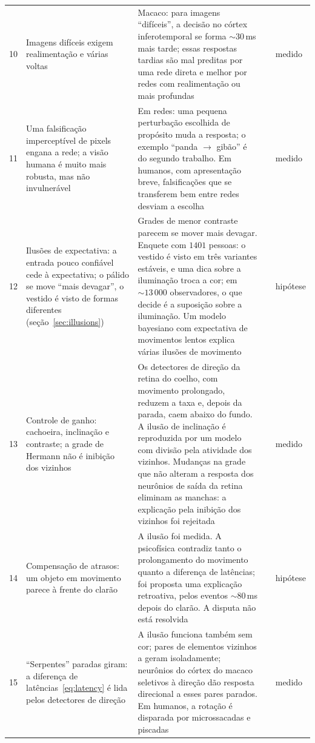 {\begin{longtable}{>{\raggedright}p{0.5cm}>{\raggedright}p{4.0cm}>{\raggedright}p{5.6cm}>{\raggedright}p{2.3cm}>{\raggedright\arraybackslash}p{1.7cm}}
10 & Imagens difíceis exigem realimentação e várias voltas & Macaco: para imagens ``difíceis'', a decisão no córtex inferotemporal se forma $\sim30$\,ms mais tarde; essas respostas tardias são mal preditas por uma rede direta e melhor por redes com realimentação ou mais profundas & \cite{Kar2019} & medido \\
11 & Uma falsificação imperceptível de pixels engana a rede; a visão humana é muito mais robusta, mas não invulnerável & Em redes: uma pequena perturbação escolhida de propósito muda a resposta; o exemplo ``panda $\to$ gibão'' é do segundo trabalho. Em humanos, com apresentação breve, falsificações que se transferem bem entre redes desviam a escolha & \cite{Szegedy2014,Goodfellow2015,Elsayed2018} & medido \\
12 & Ilusões de expectativa: a entrada pouco confiável cede à expectativa; o pálido se move ``mais devagar'', o vestido é visto de formas diferentes (seção~\ref{sec:illusions}) & Grades de menor contraste parecem se mover mais devagar. Enquete com $1401$ pessoas: o vestido é visto em três variantes estáveis, e uma dica sobre a iluminação troca a cor; em $\sim13\,000$ observadores, o que decide é a suposição sobre a iluminação. Um modelo bayesiano com expectativa de movimentos lentos explica várias ilusões de movimento & \cite{Thompson1982,LaferSousa2015,Wallisch2017,Weiss2002,Purves2011} & hipótese \\
13 & Controle de ganho: cachoeira, inclinação e contraste; a grade de Hermann não é inibição dos vizinhos & Os detectores de direção da retina do coelho, com movimento prolongado, reduzem a taxa e, depois da parada, caem abaixo do fundo. A ilusão de inclinação é reproduzida por um modelo com divisão pela atividade dos vizinhos. Mudanças na grade que não alteram a resposta dos neurônios de saída da retina eliminam as manchas: a explicação pela inibição dos vizinhos foi rejeitada & \cite{BarlowHill1963,Schwartz2009,SchillerCarvey2005} & medido \\
14 & Compensação de atrasos: um objeto em movimento parece à frente do clarão & A ilusão foi medida. A psicofísica contradiz tanto o prolongamento do movimento quanto a diferença de latências; foi proposta uma explicação retroativa, pelos eventos $\sim80$\,ms depois do clarão. A disputa não está resolvida & \cite{Nijhawan1994,EaglemanSejnowski2000} & hipótese \\
15 & ``Serpentes'' paradas giram: a diferença de latências~\eqref{eq:latency} é lida pelos detectores de direção & A ilusão funciona também sem cor; pares de elementos vizinhos a geram isoladamente; neurônios do córtex do macaco seletivos à direção dão resposta direcional a esses pares parados. Em humanos, a rotação é disparada por microssacadas e piscadas & \cite{Conway2005,OteroMillan2012} & medido \\

\end{longtable}}
